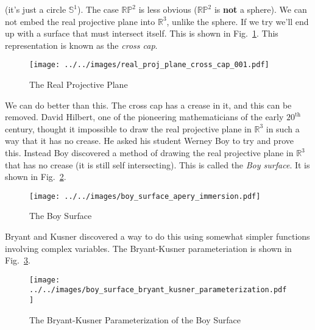 \documentclass{article}
\theoremstyle{plain}
\theoremstyle{normal}
\begin{document}
        (it's just a circle $\mathbb{S}^{1}$). The case $\mathbb{RP}^{2}$ is
        less obvious ($\mathbb{RP}^{2}$ is \textbf{not} a sphere). We can not
        embed the real projective plane into $\mathbb{R}^{3}$, unlike the
        sphere. If we try we'll end up with a surface that must intersect
        itself. This is shown in
        Fig.~\ref{fig:real_proj_plane_cross_cap_001}. This representation is
        known as the \textit{cross cap}.
        \begin{figure}
            \centering
            \texttt{[image: ../../images/real\_proj\_plane\_cross\_cap\_001.pdf]}
            \caption{The Real Projective Plane}
            \label{fig:real_proj_plane_cross_cap_001}
        \end{figure}
        We can do better than this. The cross cap has a crease in it, and this
        can be removed. David Hilbert, one of the pioneering mathematicians of
        the early $20^{\textrm{th}}$ century, thought it impossible to draw the
        real projective plane in $\mathbb{R}^{3}$ in such a way that it has
        no crease. He asked his student Werney Boy to try and prove this.
        Instead Boy discovered a method of drawing the real projective plane
        in $\mathbb{R}^{3}$ that has no crease (it is still self intersecting).
        This is called the \textit{Boy surface}. It is shown in
        Fig.~\ref{fig:boy_surface_apery_immersion}.
        \begin{figure}
            \centering
            \texttt{[image: ../../images/boy\_surface\_apery\_immersion.pdf]}
            \caption{The Boy Surface}
            \label{fig:boy_surface_apery_immersion}
        \end{figure}
        Bryant and Kusner discovered a way to do this using somewhat simpler
        functions involving complex variables. The Bryant-Kusner parameteriation
        is shown in Fig.~\ref{fig:boy_surface_bryant_kusner_parameterization}.
        \begin{figure}
            \centering
            \texttt{[image: ../../images/boy\_surface\_bryant\_kusner\_parameterization.pdf]}
            \caption{The Bryant-Kusner Parameterization of the Boy Surface}
            \label{fig:boy_surface_bryant_kusner_parameterization}
        \end{figure}
\end{document}
